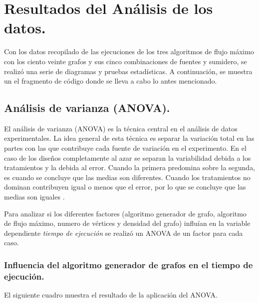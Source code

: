\documentclass{article}
\begin{document}
\section{Resultados del Análisis de los datos.}

Con los datos recopilado de las ejecuciones de los tres algoritmos de flujo máximo con los ciento veinte grafos y sus cinco combinaciones de fuentes y sumidero, se realizó una serie de diagramas y pruebas estadísticas. A continuación, se muestra un el fragmento de código donde se lleva a cabo lo antes mencionado.

 
\begin{center}

\end{center}
\subsection{Análisis de varianza (ANOVA).}
El análisis de varianza (ANOVA) es la técnica central en el análisis de datos experimentales. La idea general de esta técnica es separar la variación total en las partes con las que contribuye cada fuente de variación en el experimento. En el caso de los diseños completamente al azar se separan la variabilidad debida a los tratamientos y la debida al error. Cuando la primera predomina sobre la segunda, es cuando se concluye que las medias son diferentes. Cuando los tratamientos no dominan contribuyen igual o menos que el error, por lo que se concluye que las medias son iguales \cite{ade}.

Para analizar si los diferentes factores (algoritmo generador de grafo, algoritmo de flujo máximo, numero de vértices y densidad del grafo) influían en la variable dependiente \textit{tiempo de ejecución} se realizó un ANOVA de un factor para cada caso. 

\subsubsection{Influencia del algoritmo generador de grafos en el tiempo de ejecución.}
El siguiente cuadro muestra el resultado de la aplicación del ANOVA.
\end{document}

